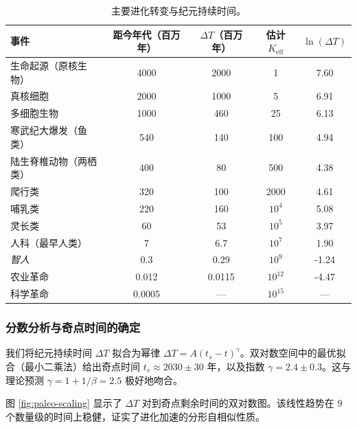 \documentclass[12pt,a4paper]{article}
\theoremstyle{remark}
\begin{document}
		\begin{table}[htbp]
			\centering
			\caption{主要进化转变与纪元持续时间。}
			\label{tab:evolutionary-epochs}
			\footnotesize \begin{tabular}{l c c c c}
				\toprule
				\textbf{事件} & \textbf{距今年代（百万年）} & $\Delta T$（百万年） & 估计 $K_{\mathrm{eff}}$ & $\ln(\Delta T)$ \\
				\midrule
				生命起源（原核生物） & 4000 & 2000 & 1 & 7.60 \\
				真核细胞 & 2000 & 1000 & 5 & 6.91 \\
				多细胞生物 & 1000 & 460 & 25 & 6.13 \\
				寒武纪大爆发（鱼类） & 540 & 140 & 100 & 4.94 \\
				陆生脊椎动物（两栖类） & 400 & 80 & 500 & 4.38 \\
				爬行类 & 320 & 100 & 2000 & 4.61 \\
				哺乳类 & 220 & 160 & $10^4$ & 5.08 \\
				灵长类 & 60 & 53 & $10^5$ & 3.97 \\
				人科（最早人类） & 7 & 6.7 & $10^7$ & 1.90 \\
				\emph{智人} & 0.3 & 0.29 & $10^9$ & -1.24 \\
				农业革命 & 0.012 & 0.0115 & $10^{12}$ & -4.47 \\
				科学革命 & 0.0005 & --- & $10^{15}$ & --- \\
				\bottomrule
			\end{tabular}
		\end{table}
		
		\subsubsection{分数分析与奇点时间的确定}
		
		我们将纪元持续时间 $\Delta T$ 拟合为幂律 $\Delta T = A (t_s - t)^{\gamma}$。双对数空间中的最优拟合（最小二乘法）给出奇点时间 $t_s \approx 2030 \pm 30$ 年，以及指数 $\gamma = 2.4 \pm 0.3$。这与理论预测 $\gamma = 1 + 1/\beta = 2.5$ 极好地吻合。
		
		图 \ref{fig:paleo-scaling} 显示了 $\Delta T$ 对到奇点剩余时间的双对数图。该线性趋势在 9 个数量级的时间上稳健，证实了进化加速的分形自相似性质。
		
\end{document}
